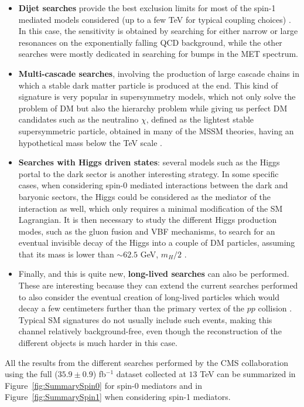 \documentclass[a4paper, 10pt, openright]{report}
\begin{document}
\begin{itemize}
\item \textbf{Dijet searches} provide the best exclusion limits for most of the spin-1 mediated models considered (up to a few TeV for typical coupling choices) \cite{DijetAtlas, DijetCMS}. In this case, the sensitivity is obtained by searching for either narrow or large resonances on the exponentially falling QCD background, while the other searches were mostly dedicated in searching for bumps in the \ac{MET} spectrum.
\item \textbf{Multi-cascade searches}, involving the production of large cascade chains in which a stable dark matter particle is produced at the end. This kind of signature is very popular in supersymmetry models, which not only solve the problem of \ac{DM} but also the hierarchy problem while giving us perfect \ac{DM} candidates such as the neutralino $\chi$, defined as the lightest stable supersymmetric particle, obtained in many of the \ac{MSSM} theories, having an hypothetical mass below the TeV scale \cite{SUSYDM}.
\item \textbf{Searches with Higgs driven states}: several models such as the Higgs portal to the dark sector is another interesting strategy. In some specific cases, when considering spin-0 mediated interactions between the dark and baryonic sectors, the Higgs could be considered as the mediator of the interaction as well, which only requires a minimal modification of the \ac{SM} Lagrangian. It is then necessary to study the different Higgs production modes, such as the gluon fusion and \ac{VBF} mechanisms, to search for an eventual invisible decay of the Higgs into a couple of \ac{DM} particles, assuming that its mass is lower than $\sim 62.5$ GeV, $m_H/2$ \cite{InvisibleHiggs}.
\item Finally, and this is quite new, \textbf{long-lived searches} can also be performed. These are interesting because they can extend the current searches performed to also consider the eventual creation of long-lived particles which would decay a few centimeters further than the primary vertex of the $pp$ collision \cite{LLSearches}. Typical \ac{SM} signatures do not usually include such events, making this channel relatively background-free, even though the reconstruction of the different objects is much harder in this case.
\end{itemize}

All the results from the different searches performed by the \ac{CMS} collaboration using the full ($35.9 \pm 0.9$) fb$^{-1}$ dataset collected at $13$ TeV can be summarized in Figure~\ref{fig:SummarySpin0} for spin-0 mediators and in Figure~\ref{fig:SummarySpin1} when considering spin-1 mediators.
\end{document}
